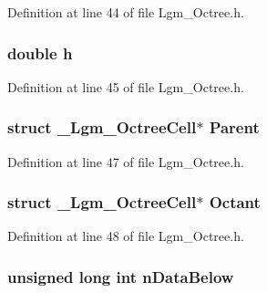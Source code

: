 Definition at line 44 of file Lgm\_\-Octree.h.\hypertarget{struct___lgm___octree_cell_8ee9be1b5aa75abae556de3088cba6d9}{
\subsubsection[{h}]{\setlength{\rightskip}{0pt plus 5cm}double {\bf h}}}
\label{struct___lgm___octree_cell_8ee9be1b5aa75abae556de3088cba6d9}




Definition at line 45 of file Lgm\_\-Octree.h.\hypertarget{struct___lgm___octree_cell_4adbef09447a8b0f9932cec8c5e507ee}{
\subsubsection[{Parent}]{\setlength{\rightskip}{0pt plus 5cm}struct {\bf \_\-Lgm\_\-OctreeCell}$\ast$ {\bf Parent}}}
\label{struct___lgm___octree_cell_4adbef09447a8b0f9932cec8c5e507ee}




Definition at line 47 of file Lgm\_\-Octree.h.\hypertarget{struct___lgm___octree_cell_3a1ad61cfa92956310b1584c5c9ccb80}{
\subsubsection[{Octant}]{\setlength{\rightskip}{0pt plus 5cm}struct {\bf \_\-Lgm\_\-OctreeCell}$\ast$ {\bf Octant}}}
\label{struct___lgm___octree_cell_3a1ad61cfa92956310b1584c5c9ccb80}




Definition at line 48 of file Lgm\_\-Octree.h.\hypertarget{struct___lgm___octree_cell_783709cb5c4b14570bf342099817323d}{
\subsubsection[{nDataBelow}]{\setlength{\rightskip}{0pt plus 5cm}unsigned long int {\bf nDataBelow}}}
\label{struct___lgm___octree_cell_783709cb5c4b14570bf342099817323d}




